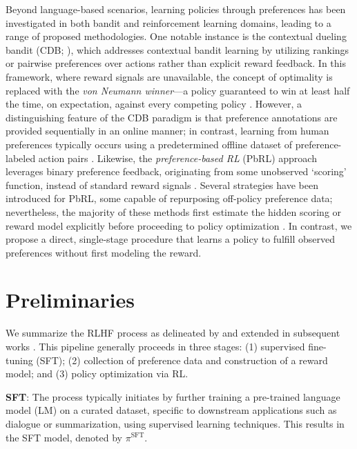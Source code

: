 Beyond language-based scenarios, learning policies through preferences has been investigated in both bandit and reinforcement learning domains, leading to a range of proposed methodologies. One notable instance is the contextual dueling bandit (CDB; \cite{yue2012karmed,dudik2015contextual}), which addresses contextual bandit learning by utilizing rankings or pairwise preferences over actions rather than explicit reward feedback. In this framework, where reward signals are unavailable, the concept of optimality is replaced with the \textit{von Neumann winner}—a policy guaranteed to win at least half the time, on expectation, against every competing policy \citep{dudik2015contextual}. However, a distinguishing feature of the CDB paradigm is that preference annotations are provided sequentially in an online manner; in contrast, learning from human preferences typically occurs using a predetermined offline dataset of preference-labeled action pairs \citep{yan2022human}. Likewise, the \textit{preference-based RL} (PbRL) approach leverages binary preference feedback, originating from some unobserved ‘scoring’ function, instead of standard reward signals \citep{BusaFekete2014,ruiz2023dueling}. Several strategies have been introduced for PbRL, some capable of repurposing off-policy preference data; nevertheless, the majority of these methods first estimate the hidden scoring or reward model explicitly before proceeding to policy optimization \citep{jain2013learning,BusaFekete2014,christiano2017deep,sadigh2017active,kupcsik2018learning}. In contrast, we propose a direct, single-stage procedure that learns a policy to fulfill observed preferences without first modeling the reward.

\section{Preliminaries}\label{section:prelims}

We summarize the RLHF process as delineated by \citeauthor{ziegler2020finetuning} and extended in subsequent works \citep{stiennon2022learning, bai2022training, ouyang2022training}. This pipeline generally proceeds in three stages: (1) supervised fine-tuning (SFT); (2) collection of preference data and construction of a reward model; and (3) policy optimization via RL.

\textbf{SFT}: The process typically initiates by further training a pre-trained language model (LM) on a curated dataset, specific to downstream applications such as dialogue or summarization, using supervised learning techniques. This results in the SFT model, denoted by $\pi^\text{SFT}$.

